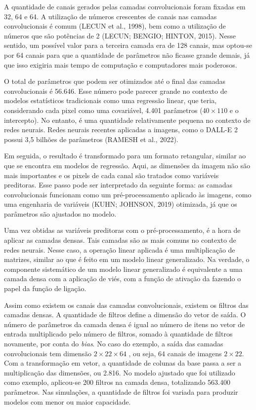 \documentclass[12pt,twoside,brazilian]{book}
\begin{document}
A quantidade de canais gerados pelas camadas convolucionais foram
fixadas em 32, 64 e 64. A utilização de números crescentes de canais nas
camadas convolucionais é comum (LECUN et al., 1998), bem como a
utilização de números que são potências de 2 (LECUN; BENGIO; HINTON,
2015). Nesse sentido, um possível valor para a terceira camada era de
128 canais, mas optou-se por 64 canais para que a quantidade de
parâmetros não ficasse grande demais, já que isso exigiria mais tempo de
computação e computadores mais poderosos.

O total de parâmetros que podem ser otimizados até o final das camadas
convolucionais é 56.646. Esse número pode parecer grande no contexto de
modelos estatísticos tradicionais como uma regressão linear, que teria,
considerando cada pixel como uma covariável, 4.401 parâmetros
(\(40\times110\) e o intercepto). No entanto, é uma quantidade
relativamente pequena no contexto de redes neurais. Redes neurais
recentes aplicadas a imagens, como o DALL-E 2 possui 3,5 bilhões de
parâmetros (RAMESH et al., 2022).

Em seguida, o resultado é transformado para um formato retangular,
similar ao que se encontra em modelos de regressão. Aqui, as dimensões
da imagem não são mais importantes e os pixels de cada canal são
tratados como variáveis preditoras. Esse passo pode ser interpretado da
seguinte forma: as camadas convolucionais funcionam como um
pré-processamento aplicado às imagens, como uma engenharia de variáveis
(KUHN; JOHNSON, 2019) otimizada, já que os parâmetros são ajustados no
modelo.

Uma vez obtidas as variáveis preditoras com o pré-processamento, é a
hora de aplicar as camadas densas. Tais camadas são as mais comuns no
contexto de redes neurais. Nesse caso, a operação linear aplicada é uma
multiplicação de matrizes, similar ao que é feito em um modelo linear
generalizado. Na verdade, o componente sistemático de um modelo linear
generalizado é equivalente a uma camada densa com a aplicação de viés,
com a função de ativação da fazendo o papel da função de ligação.

Assim como existem os canais das camadas convolucionais, existem os
filtros das camadas densas. A quantidade de filtros define a dimensão do
vetor de saída. O número de parâmetros da camada densa é igual ao número
de itens no vetor de entrada multiplicado pelo número de filtros, somado
à quantidade de filtros novamente, por conta do \emph{bias}. No caso do
exemplo, a saída das camadas convolucionais tem dimensão
\(2\times22\times64\) , ou seja, 64 canais de imagens \(2\times 22\).
Com a transformação em vetor, a quantidade de colunas da base passa a
ser a multiplicação das dimensões, ou 2.816. No modelo ajustado que foi
utilizado como exemplo, aplicou-se 200 filtros na camada densa,
totalizando 563.400 parâmetros. Nas simulações, a quantidade de filtros
foi variada para produzir modelos com menor ou maior capacidade.
\end{document}
